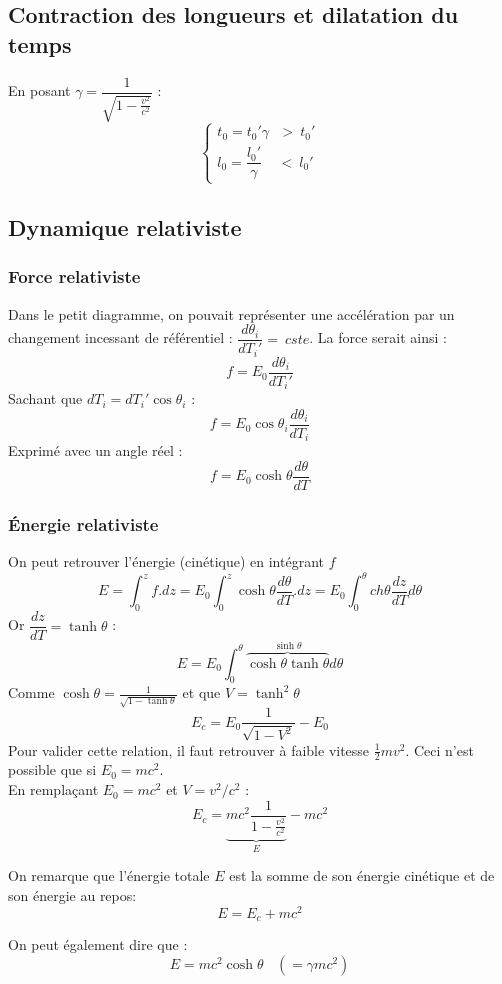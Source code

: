 \documentclass[british,french,11pt, a4paper, openany]{book}
\begin{document}
	\subsection*{Contraction des longueurs et dilatation du temps}
	En posant $\gamma = \dfrac{1}{\sqrt{1 - \frac{v^2}{c^2}}}$ :
	$$\left\{\begin{array}{l}
	t_0 = t_0' \gamma\ \ \ >\ t_0'\\
	l_0 = \dfrac{l_0'}{\gamma}\ \ \ \ \ <\ l_0'
	\end{array}\right.$$
	
	\subsection*{Dynamique relativiste}
	\subsubsection*{Force relativiste}
	Dans le petit diagramme, on pouvait représenter une accélération par un changement incessant de référentiel : $\dfrac{d\theta_i}{dT_i'} =\ cste$. La force serait ainsi :
	$$f = E_0\dfrac{d\theta_i}{dT_i'}$$
	Sachant que $dT_i = dT_i'\cos\theta_i$ :
	$$f = E_0\cos\theta_i \frac{d\theta_i}{dT_i}$$
	Exprimé avec un angle réel :
	$$ f = E_0 \cosh\theta \frac{d\theta}{dT}$$
	
	\subsubsection{Énergie relativiste}
	On peut retrouver l'énergie (cinétique) en intégrant $f$
	$$E = \int_0^z f.dz = E_0\int_0^z \cosh\theta\frac{d\theta}{dT}.dz = E_0\int_0^\theta ch\theta\frac{dz}{dT}d\theta$$
	Or $\dfrac{dz}{dT} = \tanh\theta$ :
	$$E = E_0 \int_0^\theta \overbrace{\cosh\theta\tanh\theta}^{\sinh\theta}d\theta$$
	Comme $\cosh\theta = \frac{1}{\sqrt{1 - \tanh\theta}}$ et que $V = \tanh^2\theta$
	$$E_c = E_0\frac{1}{\sqrt{1-V^2}} - E_0$$
	Pour valider cette relation, il faut retrouver à faible vitesse $\frac{1}{2}mv^2$. Ceci n'est possible que si $E_0 = mc^2$.\\
	En remplaçant $E_0 = mc^2$ et $V = v^2/c^2$ :
	$$E_c = \underbrace{mc^2 \dfrac{1}{1 - \frac{v^2}{c^2}}}_E - mc^2$$
	
	On remarque que l'énergie totale $E$ est la somme de son énergie cinétique et de son énergie au repos:
	$$E = E_c + mc^2$$
	
	On peut également dire que :
	$$E = mc^2\cosh\theta\ \ \ \ (= \gamma mc^2)$$
	
\end{document}
